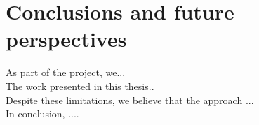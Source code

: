 \chapter{Conclusions and future perspectives}\label{chp:conclusions}

As part of the project, we...\\

The work presented in this thesis..\\

Despite these limitations, we believe that the approach ...\\

In conclusion, ....
